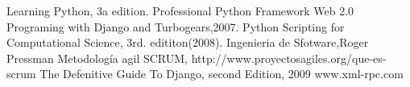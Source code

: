 \begin{thebibliography}{2007}
Learning Python, 3a edition.
Professional Python Framework Web 2.0 Programing with Django and Turbogears,2007.
Python Scripting for Computational Science, 3rd. edititon(2008). 
Ingenieria de Sfotware,Roger Pressman
Metodología agil SCRUM, http://www.proyectosagiles.org/que-es-scrum
The Defenitive Guide To Django, second Edition, 2009
www.xml-rpc.com
\end{thebibliography}